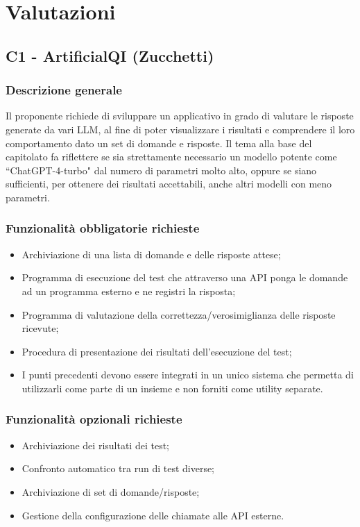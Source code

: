 \documentclass[10pt]{article}
\begin{document}
\subsectionfont{\color{orange}}  %

\section{Valutazioni}
\subsection{C1 - ArtificialQI (Zucchetti)}
\subsubsection{Descrizione generale}
Il proponente richiede di sviluppare un applicativo in grado di valutare le risposte generate da vari LLM, al fine di poter visualizzare i risultati e comprendere il loro comportamento dato un set di domande e risposte. Il tema alla base del capitolato fa riflettere se sia strettamente necessario un modello potente come ``ChatGPT-4-turbo" dal numero di parametri molto alto, oppure se siano sufficienti, per ottenere dei risultati accettabili, anche altri modelli con meno parametri.
\subsubsection{Funzionalità obbligatorie richieste}
\begin{itemize}
    \item Archiviazione di una lista di domande e delle risposte attese;
    \item Programma di esecuzione del test che attraverso una API ponga le domande ad un programma esterno e ne registri la risposta;
    \item Programma di valutazione della correttezza/verosimiglianza delle risposte ricevute;
    \item Procedura di presentazione dei risultati dell’esecuzione del test;
    \item I punti precedenti devono essere integrati in un unico sistema che permetta di utilizzarli come parte di un insieme e non forniti come utility separate.
\end{itemize}
\subsubsection{Funzionalità opzionali richieste}
\begin{itemize}
    \item Archiviazione dei risultati dei test;
    \item Confronto automatico tra run di test diverse;
    \item Archiviazione di set di domande/risposte;
    \item Gestione della configurazione delle chiamate alle API esterne.
\end{itemize}
\end{document}
